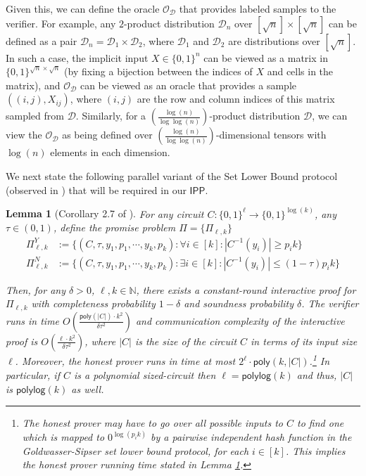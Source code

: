\documentclass[10pt,a4paper]{article}
\newtheorem{lemma}[theorem]{Lemma}
\newcommand{\poly}{\mathsf{poly}}
\newcommand{\polylog}{\mathsf{polylog}}
\newcommand{\IPP}{\mathsf{IPP}}
\newcommand{\N}{\mathbb{N}}
\newcommand{\sD}{\mathcal{D}}
\newcommand{\sO}{\mathcal{O}}
\begin{document}
Given this, we can define the oracle $\sO_\sD$ that provides labeled samples to the verifier. For example, any $2$-product distribution $\sD_n$ over $[\sqrt{n}] \times [\sqrt{n}]$ can be defined as a pair $\sD_n = \sD_1 \times \sD_2$, where $\sD_1$ and $\sD_2$ are distributions over $[\sqrt{n}]$. In such a case, the implicit input $X \in \{0,1\}^n$ can be viewed as a matrix in $\{0,1\}^{\sqrt{n} \times \sqrt{n}}$ (by fixing a bijection between the indices of $X$ and cells in the matrix), and $\sO_\sD$ can be viewed as an oracle that provides a sample $((i,j),X_{ij})$, where $(i,j)$ are the row and column indices of this matrix sampled from $\sD$. Similarly, for a $\left( \frac{\log (n)}{\log \log (n)} \right)$-product distribution $\sD$, we can view the $\sO_\sD$ as being defined over $\left( \frac{\log (n)}{\log \log (n)} \right)$-dimensional tensors with $\log (n)$ elements in each dimension. 

\vspace{0.1in}
We next state the following parallel variant of the Set Lower Bound protocol \cite{GS86} (observed in \cite{BT06}) that will be required in our $\IPP$.

\begin{lemma}[Corollary 2.7 of \cite{BT06}]
    \label{lem:lb_bt06}
    For any circuit $C:\{0,1\}^\ell \rightarrow\{0,1\}^{\log (k)}$, any $\tau \in (0,1)$, define the promise problem $\Pi = \{\Pi_{\ell,k}\}$
    \begin{equation*}
        \begin{split}
        \Pi^{Y}_{\ell,k} &:=\{(C,\tau,y_{1},p_{1},\cdots, y_{k},p_{k}):\forall i\in[k]:|C^{-1}(y_{i})|\geq p_i k\}\\
        \Pi^{N}_{\ell,k} &:=\{(C,\tau,y_{1},p_{1},\cdots, y_{k},p_{k}):\exists i\in[k]:|C^{-1}(y_{i})| \leq (1-\tau)p_{i}k\}
        \end{split}    
    \end{equation*}

    Then, for any $\delta > 0$, $\ell, k \in \N$, there exists a constant-round interactive proof for $\Pi_{\ell,k}$ with completeness probability $1-\delta$ and soundness probability $\delta$. The verifier runs in time $O \left( \frac{\poly(\vert C \vert) \cdot k^2}{\delta \tau^2} \right)$ and communication complexity of the interactive proof is $O \left( \frac{\ell \cdot k^2}{\delta \tau^2} \right)$, where $\vert C \vert$ is the size of the circuit $C$ in terms of its input size $\ell$. Moreover, the honest prover runs in time at most $2^\ell \cdot \poly(k,\vert C \vert)$.\footnote{The honest prover may have to go over all possible inputs to $C$ to find one which is mapped to $0^{\log (p_i k)}$ by a pairwise independent hash function in the Goldwasser-Sipser set lower bound protocol, for each $i \in [k]$. This implies the honest prover running time stated in Lemma \ref{lem:lb_bt06}.} In particular, if $C$ is a polynomial sized-circuit then $\ell = \polylog(k)$ and thus, $\vert C \vert$ is $\polylog(k)$ as well.
\end{lemma}
\end{document}
